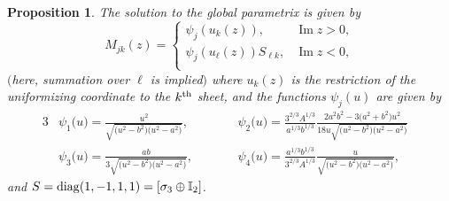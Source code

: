\documentclass[pdftex]{sigma}
\numberwithin{equation}{section}
\newtheorem{Proposition}[Theorem]{Proposition}
 { \theoremstyle{definition}
\newtheorem{Definition}[Theorem]{Definition}
\newtheorem{Note}[Theorem]{Note}
\newtheorem{Example}[Theorem]{Example}
\newtheorem{Remark}[Theorem]{Remark} }
\begin{document}
 \begin{Proposition}
 The solution to the global parametrix is given by
 \begin{equation*}
 M_{jk}(z) = \begin{cases}
 \psi_j(u_k(z)), & \operatorname{Im} z >0,\\
 \psi_j(u_\ell(z))S_{\ell k}, & \operatorname{Im} z <0,\\
 \end{cases}
 \end{equation*}
 $($here, summation over $\ell$ is implied$)$ where $u_k(z)$ is the restriction of the uniformizing coordinate to the $k^{\rm th}$ sheet, and the functions $\psi_j(u)$ are given by
 \begin{alignat*}{3}
 &\psi_1\bigl(u\bigr) = \frac{u^2}{\sqrt{\bigl(u^2-b^2\bigr)\bigl(u^2-a^2\bigr)}}, \qquad && \psi_2\bigl(u\bigr) = \frac{3^{2/3}A^{1/3}}{a^{1/3}b^{1/3} }\frac{2a^2b^2-3\bigl(a^2+b^2\bigr)u^2}{18u\sqrt{\bigl(u^2-b^2\bigr)\bigl(u^2-a^2\bigr)}}& \\
 &\psi_3\bigl(u\bigr) = \frac{ab}{3\sqrt{\bigl(u^2-b^2\bigr)\bigl(u^2-a^2\bigr)}}, \qquad && \psi_4\bigl(u\bigr) = \frac{a^{1/3}b^{1/3} }{3^{2/3}A^{1/3} }\frac{u}{\sqrt{\bigl(u^2-b^2\bigr)\bigl(u^2-a^2\bigr)}},&
 \end{alignat*}
 and $S = {\rm diag}(1, -1, 1, 1) = [\sigma_3 \oplus \mathbb{I}_2]$.
 \end{Proposition}
\end{document}
